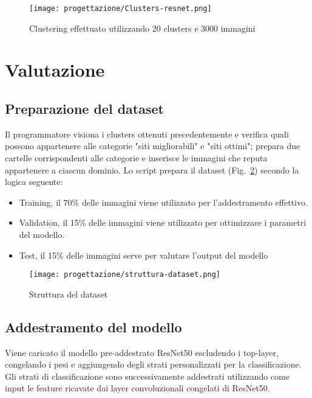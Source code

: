 \begin{figure}[!h] 
  \centering 
  \texttt{[image: progettazione/Clusters-resnet.png]} 
  \caption{Clustering effettuato utilizzando 20 clusters e 3000 immagini}
  \label{fig:clusters-resnet}
\end{figure}



\newpage

\section{Valutazione}

\subsection{Preparazione del dataset}
Il programmatore visiona i clusters ottenuti precedentemente e verifica quali possono appartenere alle categorie "siti migliorabili" e "siti ottimi"; prepara due cartelle corrispondenti alle categorie e inserisce le immagini che reputa appartenere a ciascun dominio.
Lo script prepara il dataset (Fig.~\ref{fig:struttura-dataset}) secondo la logica seguente:
\begin{itemize}
  \item Training, il 70\% delle immagini viene utilizzato per l'addestramento effettivo.
  \item Validation, il 15\% delle immagini viene utilizzato per ottimizzare i parametri del modello.
  \item Test, il 15\% delle immagini serve per valutare l'output del modello
\end{itemize}

\begin{figure}[!h] 
  \centering 
  \texttt{[image: progettazione/struttura-dataset.png]} 
  \caption{Struttura del dataset}
  \label{fig:struttura-dataset}
\end{figure}

\subsection{Addestramento del modello}
Viene caricato il modello pre-addestrato ResNet50 escludendo i top-layer, congelando i pesi e aggiungendo degli strati personalizzati per la classificazione.
Gli strati di classificazione sono successivamente addestrati utilizzando come input le feature ricavate dai layer convoluzionali congelati di ResNet50. 

